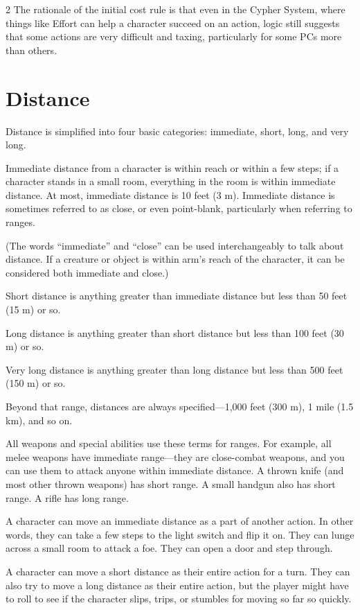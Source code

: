 \begin{multicols}{2}
The rationale of the initial cost rule is that even in the Cypher System, where things like Effort can help a character succeed on an action, logic still suggests that some actions are very difficult and taxing, particularly for some PCs more than others.

\section{Distance}

Distance is simplified into four basic categories: immediate, short, long, and very long.

Immediate distance from a character is within reach or within a few steps; if a character stands in a small room, everything in the room is within immediate distance. At most, immediate distance is 10 feet (3 m). Immediate distance is sometimes referred to as close, or even
point-blank, particularly when referring to ranges.

(The words “immediate” and “close” can be used interchangeably to talk about distance. If a creature or object is within arm’s reach of the character, it can be considered both immediate and close.)

Short distance is anything greater than immediate distance but less than 50 feet (15 m) or so.

Long distance is anything greater than short distance but less than 100 feet (30 m) or so. 

Very long distance is anything greater than long distance but less than 500 feet (150 m) or so. 

Beyond that range, distances are always specified—1,000 feet (300 m), 1 mile (1.5 km), and so on.

All weapons and special abilities use these terms for ranges. For example, all melee weapons have immediate range—they are close-combat weapons, and you can use them to attack anyone within immediate distance. A thrown knife (and most other thrown weapons) has short range. A small handgun also has short range. A rifle has long range.

A character can move an immediate distance as a part of another action. In other words, they can take a few steps to the light switch and flip it on. They can lunge across a small room to attack a foe. They can open a door and step through.

A character can move a short distance as their entire action for a turn. They can also try to move a long distance as their entire action, but the player might have to roll to see if the character slips, trips, or stumbles for moving so far so quickly.


\end{multicols}
